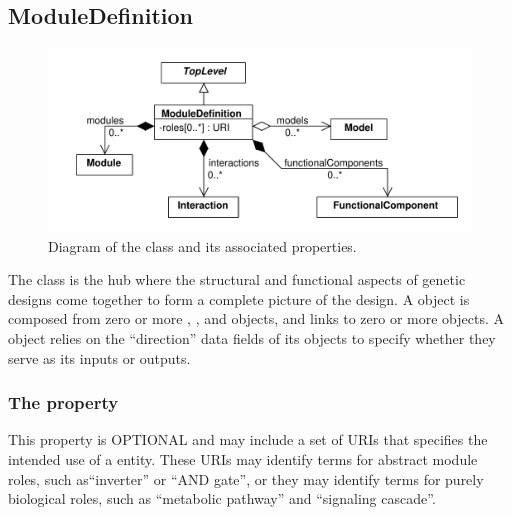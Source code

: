 \subsection{ModuleDefinition}
\label{sec:ModuleDefinition}


\begin{figure}[ht]
\begin{center}
\includegraphics[scale=0.6]{uml/module_definition}
\caption[]{Diagram of the  class and its associated properties.}
\label{uml:module_definition}
\end{center}
\end{figure}

The  class is the hub where the structural and functional aspects of genetic designs come together to form a complete picture of the design. 
A  object is composed from zero or more , , and  objects, and links to zero or more  objects. 
A  object relies on the ``direction'' data fields of its  objects to specify whether they serve as its inputs or outputs.

\subsubsection*{The  property}\label{sec:roles}
This property is OPTIONAL and may include a set of URIs that specifies the intended use of a  entity. 
These URIs may identify terms for abstract module roles, such as``inverter'' or ``AND gate'', or they may identify terms for purely biological roles, such as ``metabolic pathway'' and ``signaling cascade''.

